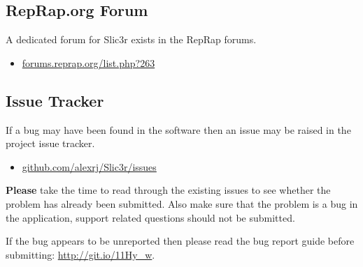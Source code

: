 \subsection{RepRap.org Forum} %
\label{sub:reprap_org_forum}


A dedicated forum for Slic3r exists in the RepRap forums.
\begin{itemize}
    \item \url{forums.reprap.org/list.php?263}
\end{itemize}


\subsection{Issue Tracker} %
\label{sub:issue_tracker}

If a bug may have been found in the software then an issue may be raised in the project issue tracker.

\begin{itemize}
    \item \url{github.com/alexrj/Slic3r/issues}
\end{itemize}

\textbf{Please} take the time to read through the existing issues to see whether the problem has already been submitted.  Also make sure that the problem is a bug in the application, support related questions should not be submitted.

If the bug appears to be unreported then please read the bug report guide before submitting: \url{http://git.io/11Hy_w}.


